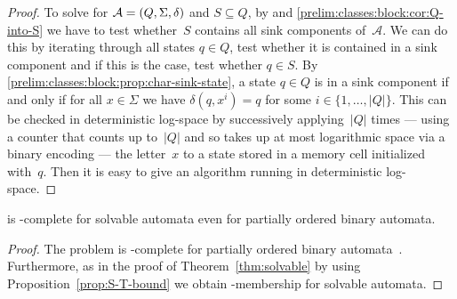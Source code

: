 \begin{proof}
	To solve \SIS for $\mathcal A = (Q, \Sigma, \delta)$ and $S \subseteq Q$, 
	by 
	and \cref{prelim:classes:block:cor:Q-into-S}
we have to test whether~$S$ contains all sink components of~$\mathcal A$.
We can do this by iterating through all states $q \in Q$,
test whether it is contained in a sink component
and if this is the case, test whether $q \in S$.
By \cref{prelim:classes:block:prop:char-sink-state},
a state $q \in Q$
is in a sink component if and only if for all $x \in \Sigma$ 
we have $\delta(q, x^i) = q$ for some $i \in \{1,\ldots,|Q|\}$.
This can be checked in deterministic log-space
by successively applying~$|Q|$ times --- using a counter that counts 
up to~$|Q|$ and so takes up at most logarithmic space via a binary encoding --- the letter~$x$ to a state stored in 
a memory cell initialized with~$q$. Then it is easy to give an algorithm running
in deterministic log-space.
\end{proof}

\begin{theorem} \label{prelim:compl:thm:reach-NP}
	\REACH is \NP-complete for solvable automata even for partially ordered binary automata.	
\end{theorem}
\begin{proof}
	The problem is \NP-complete for partially ordered binary
	automata~\cite[Thm.~5]{Ryzhikov19a}.
	Furthermore, as in the proof of Theorem~\ref{thm:solvable}
	by using Proposition~\ref{prop:S-T-bound}
	we obtain \NP-membership for solvable automata. 
\end{proof}

